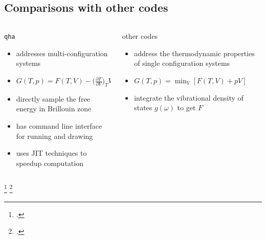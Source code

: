 \documentclass[13pt,aspectratio=169]{beamer}
\begin{document}
\subsection{Comparisons with other codes}
\begin{frame}{\subsecname}
	\begin{columns}
		\begin{column}{0.45\textwidth}
			\texttt{qha}\\
			\begin{itemize}[<+(1)->]
				\item addresses multi-configuration systems
				\item $G(T,p) = F(T, V) - \Big( \frac{ \partial F }{ \partial V } \Big)_T V$
				\item directly sample the free energy in Brillouin zone
				\item has command line interface for running and drawing
				\item uses JIT techniques to speedup computation
			\end{itemize}
		\end{column}

		\begin{column}{0.45\textwidth}
			other codes\\
			\begin{itemize}
				\item address the thermodynamic properties of single configuration systems
				\item $G(T,p)= \min_{V}[F(T,V)+pV]$ \footnotemark
				\item integrate the vibrational density of states $g(\omega)$ to get $F$ \footnotemark
			\end{itemize}
		\end{column}
	\end{columns}
	\setcounter{footnote}{5}
	\footcitetext{Wu:2011ea}
	\footcitetext{Petretto:2018gg}
\end{frame}
\end{document}

